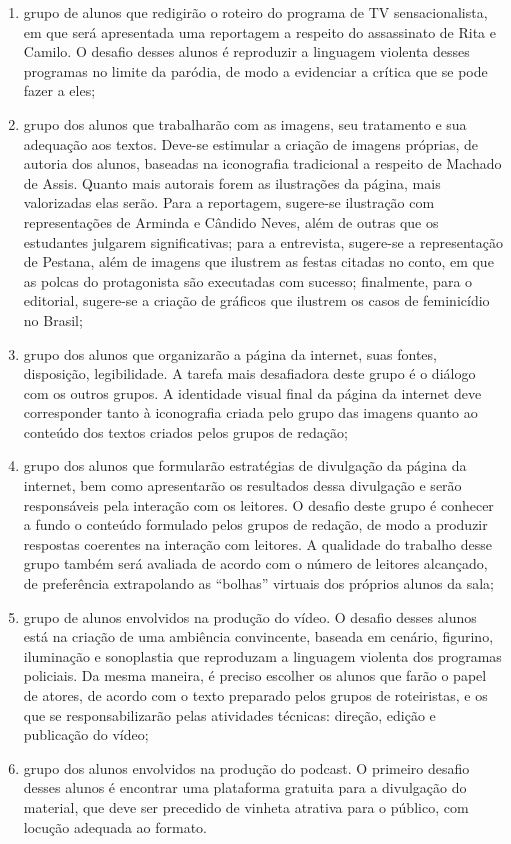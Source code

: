\documentclass[11pt]{extarticle}
\begin{document}
\begin{enumerate}
\item grupo de alunos que redigirão o roteiro do programa de TV
sensacionalista, em que será apresentada uma reportagem a respeito do
assassinato de Rita e Camilo. O desafio desses alunos é reproduzir a
linguagem violenta desses programas no limite da paródia, de modo a
evidenciar a crítica que se pode fazer a eles;

\item grupo dos alunos que trabalharão com as imagens, seu tratamento e sua
adequação aos textos. Deve-se estimular a criação de imagens próprias,
de autoria dos alunos, baseadas na iconografia tradicional a respeito de
Machado de Assis. Quanto mais autorais forem as ilustrações da página,
mais valorizadas elas serão. Para a reportagem, sugere-se ilustração com
representações de Arminda e Cândido Neves, além de outras que os
estudantes julgarem significativas; para a entrevista, sugere-se a
representação de Pestana, além de imagens que ilustrem as festas citadas
no conto, em que as polcas do protagonista são executadas com sucesso;
finalmente, para o editorial, sugere-se a criação de gráficos que
ilustrem os casos de feminicídio no Brasil;

\item grupo dos alunos que organizarão a página da internet, suas fontes,
disposição, legibilidade. A tarefa mais desafiadora deste grupo é o
diálogo com os outros grupos. A identidade visual final da página da
internet deve corresponder tanto à iconografia criada pelo grupo das
imagens quanto ao conteúdo dos textos criados pelos grupos de redação;

\item grupo dos alunos que formularão estratégias de divulgação da página
da internet, bem como apresentarão os resultados dessa divulgação e
serão responsáveis pela interação com os leitores. O desafio deste grupo
é conhecer a fundo o conteúdo formulado pelos grupos de redação, de modo
a produzir respostas coerentes na interação com leitores. A qualidade do
trabalho desse grupo também será avaliada de acordo com o número de
leitores alcançado, de preferência extrapolando as ``bolhas'' virtuais
dos próprios alunos da sala;

\item grupo de alunos envolvidos na produção do vídeo. O desafio desses
alunos está na criação de uma ambiência convincente, baseada em cenário,
figurino, iluminação e sonoplastia que reproduzam a linguagem violenta
dos programas policiais. Da mesma maneira, é preciso escolher os alunos
que farão o papel de atores, de acordo com o texto preparado pelos
grupos de roteiristas, e os que se responsabilizarão pelas atividades
técnicas: direção, edição e publicação do vídeo;

\item grupo dos alunos envolvidos na produção do podcast. O primeiro
desafio desses alunos é encontrar uma plataforma gratuita para a
divulgação do material, que deve ser precedido de vinheta atrativa para
o público, com locução adequada ao formato.
\end{enumerate}
\end{document}
